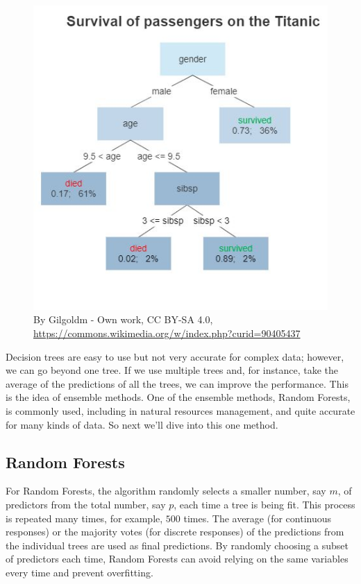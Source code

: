 \documentclass[
]{book}
\begin{document}
\begin{figure}
\centering
\includegraphics{images/Decision_Tree.jpg}
\caption{By Gilgoldm - Own work, CC BY-SA 4.0, \url{https://commons.wikimedia.org/w/index.php?curid=90405437}}
\end{figure}

Decision trees are easy to use but not very accurate for complex data; however, we can go beyond one tree. If we use multiple trees and, for instance, take the average of the predictions of all the trees, we can improve the performance. This is the idea of ensemble methods. One of the ensemble methods, Random Forests, is commonly used, including in natural resources management, and quite accurate for many kinds of data. So next we'll dive into this one method.

\hypertarget{random-forests}{%
\subsection{Random Forests}\label{random-forests}}

For Random Forests, the algorithm randomly selects a smaller number, say \(m\), of predictors from the total number, say \(p\), each time a tree is being fit. This process is repeated many times, for example, \(500\) times. The average (for continuous responses) or the majority votes (for discrete responses) of the predictions from the individual trees are used as final predictions. By randomly choosing a subset of predictors each time, Random Forests can avoid relying on the same variables every time and prevent overfitting.
\end{document}
